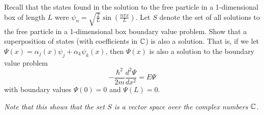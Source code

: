 \documentclass[12pt]{article} %
\begin{document}
\begin{problem}
Recall that the states found in the solution to the free particle in a 1-dimensional box of length $L$ were $\psi_n = \sqrt{\frac{2}{L}} \sin \left( \frac{n\pi x}{L}\right)$. Let $S$ denote the set of all solutions to the free particle in a 1-dimensional box boundary value problem. Show that a superposition of states (with coefficients in $\mathbb{C}$) is also a solution. That is, if we let $\Psi(x) = \alpha_{j}(x) \psi_j + \alpha_k \psi_k(x)$, then $\Psi(x)$ is also a solution to the boundary value problem
\[
-\frac{\hbar^2}{2m}\frac{d^2 \Psi}{dx^2}=E\Psi
\]
with boundary values $\Psi(0)=0$ and $\Psi(L)=0$.

\noindent \emph{Note that this shows that the set $S$ is a vector space over the complex numbers $\mathbb{C}$.}
\end{problem}
\end{document}
